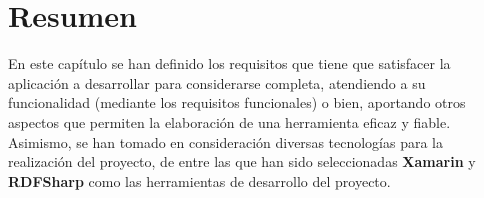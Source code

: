 
\section{Resumen}
En este capítulo se han definido los requisitos que tiene que satisfacer la aplicación a desarrollar para 
considerarse completa, atendiendo a su funcionalidad (mediante los requisitos funcionales) o bien, 
aportando otros aspectos que permiten la elaboración de una herramienta eficaz y fiable. Asimismo, se han 
tomado en consideración diversas tecnologías para la realización del proyecto, de entre las que han 
sido seleccionadas \textbf{Xamarin} y \textbf{RDFSharp} como las herramientas de desarrollo del proyecto.